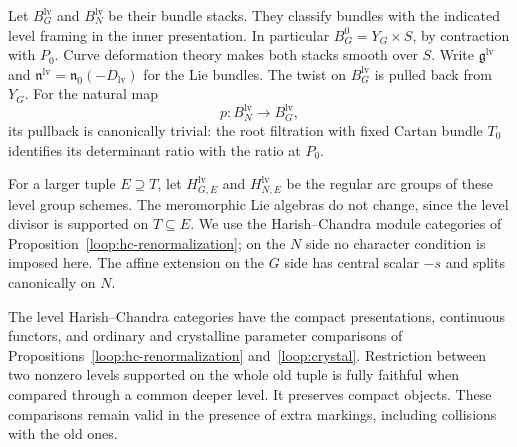 Let $B_G^{\mathrm{lv}}$ and $B_N^{\mathrm{lv}}$ be their bundle stacks.
They classify bundles with the indicated level framing in the inner
presentation.  In particular $B_G^0=Y_G\times S$, by contraction with
$P_0$.  Curve deformation theory makes both stacks smooth over $S$.
Write $\mathfrak g^{\mathrm{lv}}$ and
$\mathfrak n^{\mathrm{lv}}=\mathfrak n_0(-D_{\mathrm{lv}})$ for the Lie
bundles.  The twist on $B_G^{\mathrm{lv}}$ is pulled back from $Y_G$.
For the natural map
\[
 p:B_N^{\mathrm{lv}}\longrightarrow B_G^{\mathrm{lv}},
\]
its pullback is canonically trivial: the root filtration with fixed
Cartan bundle $T_0$ identifies its determinant ratio with the ratio at
$P_0$.

For a larger tuple $E\supseteq T$, let
$H_{G,E}^{\mathrm{lv}}$ and $H_{N,E}^{\mathrm{lv}}$ be the regular arc
groups of these level group schemes.  The meromorphic Lie algebras do
not change, since the level divisor is supported on $T\subseteq E$.
We use the Harish--Chandra module categories of
Proposition~\ref{loop:hc-renormalization}; on the $N$ side no character condition is imposed here.
The affine extension on the $G$ side has central scalar $-s$ and splits
canonically on $N$.

\begin{lemma}\label{loc:levels}
The level Harish--Chandra categories have the compact presentations,
continuous functors, and ordinary and crystalline parameter comparisons
of Propositions~\ref{loop:hc-renormalization} and~\ref{loop:crystal}.  Restriction between two nonzero levels supported on
the whole old tuple is fully faithful when compared through a common
deeper level.  It preserves compact objects.  These comparisons remain
valid in the presence of extra markings, including collisions with the
old ones.
\end{lemma}

